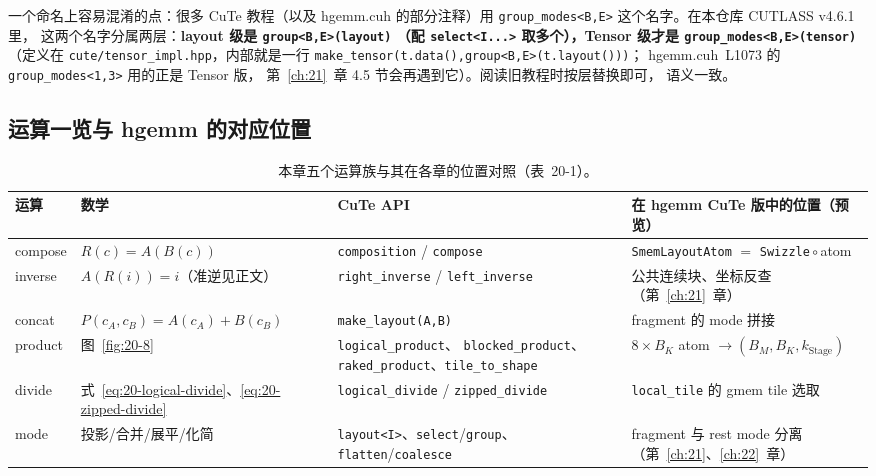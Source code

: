 \begin{sloppypar}
一个命名上容易混淆的点：很多 CuTe 教程（以及 hgemm.cuh 的部分注释）用
\texttt{group\_\allowbreak{}modes\allowbreak{}<B,\allowbreak{}E>} 这个名字。在本仓库 CUTLASS v4.6.1 里，
这两个名字分属两层：\textbf{layout 级是 \texttt{group\allowbreak{}<B,\allowbreak{}E>\allowbreak{}(layout)}
（配 \texttt{select\allowbreak{}<I.\allowbreak{}.\allowbreak{}.\allowbreak{}>} 取多个），Tensor 级才是
\texttt{group\_\allowbreak{}modes\allowbreak{}<B,\allowbreak{}E>}\allowbreak\texttt{(tensor)}}（定义在
\texttt{cute/\allowbreak{}tensor\_\allowbreak{}impl.\allowbreak{}hpp}，内部就是一行
\texttt{make\_\allowbreak{}tensor\allowbreak{}(t.\allowbreak{}data\allowbreak{}(),\allowbreak{}}\allowbreak\texttt{group\allowbreak{}<B,\allowbreak{}E>\allowbreak{}(t.\allowbreak{}layout\allowbreak{}()))}；
hgemm.cuh~L1073 的 \texttt{group\_\allowbreak{}modes\allowbreak{}<1,\allowbreak{}3>} 用的正是 Tensor 版，
第~\ref{ch:21}~章 4.5 节会再遇到它）。阅读旧教程时按层替换即可，
语义一致。
\end{sloppypar}

\subsection{运算一览与 hgemm 的对应位置}

\begin{table}[htbp]
\centering
\footnotesize
\begin{tabular}{@{}p{1.3cm}p{3.2cm}p{3.7cm}p{4.3cm}@{}}
  \hline
  运算 & 数学 & CuTe API & 在 hgemm CuTe 版中的位置（预览） \\
  \hline
  compose & $R(c)=A(B(c))$ & \texttt{composition} / \texttt{compose}
    & \texttt{Smem\allowbreak{}Layout\allowbreak{}Atom} $=$ \texttt{Swizzle}\,$\circ$\,atom \\
  inverse & $A(R(i))=i$（准逆见正文） & \texttt{right\_\allowbreak{}inverse} / \texttt{left\_\allowbreak{}inverse}
    & 公共连续块、坐标反查（第~\ref{ch:21}~章） \\
  concat & $P(c_A,c_B)=A(c_A)+B(c_B)$ & \texttt{make\_\allowbreak{}layout\allowbreak{}(A,\allowbreak{}B)}
    & fragment 的 mode 拼接 \\
  product & 图~\ref{fig:20-8} & \texttt{logical\_\allowbreak{}product}、
    \texttt{blocked\_\allowbreak{}product}、\texttt{raked\_\allowbreak{}product}、\texttt{tile\_\allowbreak{}to\_\allowbreak{}shape}
    & $8\times B_K$ atom $\to(B_M,B_K,k_{\mathrm{Stage}})$ \\
  divide & 式~\eqref{eq:20-logical-divide}、\eqref{eq:20-zipped-divide}
    & \texttt{logical\_\allowbreak{}divide} / \texttt{zipped\_\allowbreak{}divide}
    & \texttt{local\_tile} 的 gmem tile 选取 \\
  mode & 投影/合并/展平/化简 & \texttt{layout<I>}、\texttt{select}/\texttt{group}、
    \texttt{flatten}/\texttt{coalesce}
    & fragment 与 rest mode 分离（第~\ref{ch:21}、\ref{ch:22}~章） \\
  \hline
\end{tabular}
\caption{本章五个运算族与其在各章的位置对照（表~20-1）。}\label{tab:20-1}
\end{table}

